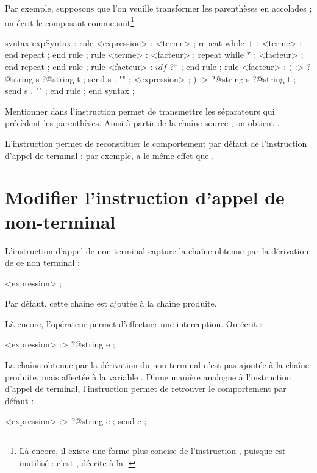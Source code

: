 Par exemple, supposons que l'on veuille transformer les parenthèses en accolades ; on écrit le composant  comme suit\footnote{Là encore, il existe une forme plus concise de l'instruction , puisque  est inutilisé : c'est , décrite  à la .} :
\begin{galgascode}
syntax expSyntax :
  rule <expression> :
    <terme> ;
    repeat while $+$ ; <terme> ; end repeat ;
  end rule ;
  rule <terme> :
    <facteur> ;
    repeat while $*$ ; <facteur> ; end repeat ;
  end rule ;
  rule <facteur> :
    $idf$ ?* ;
  end rule ;
  rule <facteur> :
    $($ :> ?@string s ?@string t ; send s . "{" ;
    <expression> ;
    $)$ :> ?@string s ?@string t ; send s . "}" ;
  end rule ;
end syntax ;
\end{galgascode}

Mentionner  dans l'instruction  permet de transmettre les séparateurs qui précèdent les parenthèses. Ainsi à partir de la chaîne source , on obtient .


L'instruction  permet de reconstituer le comportement par défaut de l'instruction d'appel de terminal : par exemple,  a le même effet que \galgas{$($ ;}.





\section{Modifier l'instruction d'appel de non-terminal}

L'instruction d'appel de non terminal capture la chaîne obtenue par la dérivation de ce non terminal :
\begin{galgascode}
<expression> ;
\end{galgascode}


Par défaut, cette chaîne est ajoutée à la chaîne produite.

Là encore, l'opérateur \galgas{\:>} permet d'effectuer une interception. On écrit :
\begin{galgascode}
<expression> :> ?@string e ;
\end{galgascode}

La chaîne obtenue par la dérivation du non terminal  n'est pas ajoutée à la chaîne produite, mais affectée à la variable . D'une manière analogue à l'instruction d'appel de terminal, l'instruction  permet de retrouver le comportement par défaut :
\begin{galgascode}
<expression> :> ?@string e ; send e ;
\end{galgascode}

